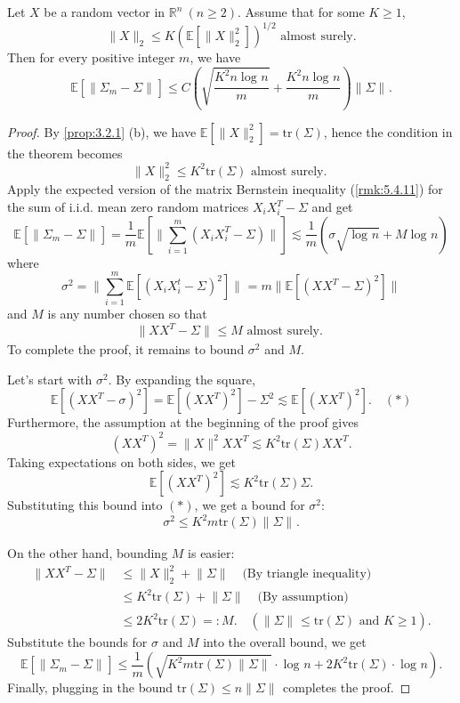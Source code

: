 \begin{theorem}
\label{thm:5.6.1} 
Let $X$ be a random vector in $\mathbb{R}^n \ (n \geq 2)$. Assume that for some $K \geq 1$, 
\[ \lVert X \rVert_{2} \leq K (\mathbb{E}\left[ \lVert X \rVert_{2}^2 \right])^{1/2} \text{ almost surely.} \]
Then for every positive integer $m$, we have 
\[ \mathbb{E}\left[ \lVert \Sigma_m - \Sigma \rVert_{} \right] \leq C \left( 
\sqrt{\frac{K^2 n \log_{}{n}}{m}} + \frac{K^2 n \log_{}{n}}{m} \right) \lVert \Sigma \rVert_{}. \]
\end{theorem}

\begin{proof}
By \cref{prop:3.2.1} (b), we have $\mathbb{E}\left[ \lVert X \rVert_{2}^2 \right] = \mathrm{tr}(\Sigma)$, hence 
the condition in the theorem becomes 
\[ \lVert X \rVert_{2}^2 \leq K^2 \mathrm{tr}(\Sigma) \text{ almost surely. } \]
Apply the expected version of the matrix Bernstein inequality (\cref{rmk:5.4.11}) for the sum of i.i.d. mean 
zero random matrices $X_iX_i^T - \Sigma$ and get 
\[ \mathbb{E}\left[ \lVert \Sigma_m - \Sigma \rVert_{} \right] = 
\frac{1}{m} \mathbb{E}\left[ \lVert \sum_{i = 1}^{m} (X_iX_i^T - \Sigma) \rVert_{} \right] 
\lesssim \frac{1}{m} (\sigma \sqrt{\log_{}{n}} + M \log_{}{n}) \]
where 
\[ \sigma^2 = \lVert \sum_{i = 1}^{m} \mathbb{E}\left[ (X_iX_i^t - \Sigma)^2 \right] \rVert_{} 
= m \lVert \mathbb{E}\left[ (XX^T - \Sigma)^2 \right] \rVert_{} \]
and $M$ is any number chosen so that 
\[ \lVert XX^T - \Sigma \rVert_{} \leq M \text{ almost surely. } \]
To complete the proof, it remains to bound $\sigma^2$ and $M$.

Let's start with $\sigma^2$. By expanding the square, 
\[ \mathbb{E}\left[ (XX^T - \sigma)^2 \right] = \mathbb{E}\left[ (XX^T)^2 \right] - \Sigma^2 
\lesssim \mathbb{E}\left[ (XX^T)^2 \right]. \quad (*) \]
Furthermore, the assumption at the beginning of the proof gives 
\[ (XX^T)^2 = \lVert X \rVert_{}^2 XX^T \lesssim K^2 \mathrm{tr}(\Sigma) XX^T. \]
Taking expectations on both sides, we get 
\[ \mathbb{E}\left[ (XX^T)^2 \right] \lesssim K^2 \mathrm{tr}(\Sigma) \Sigma. \]
Substituting this bound into $(*)$, we get a bound for $\sigma^2$:
\[ \sigma^2 \leq K^2 m \mathrm{tr}(\Sigma) \lVert \Sigma \rVert_{}. \]


On the other hand, bounding $M$ is easier:
\begin{align*}
	\lVert XX^T - \Sigma \rVert_{} 
	&\leq \lVert X \rVert_{2}^2 + \lVert \Sigma \rVert_{} \quad \text{(By triangle inequality)} \\
	&\leq K^2 \mathrm{tr}(\Sigma) + \lVert \Sigma \rVert_{} \quad \text{(By assumption)} \\
	&\leq 2K^2 \mathrm{tr}(\Sigma) =: M. \quad (\lVert \Sigma \rVert_{} \leq \mathrm{tr}(\Sigma) \text{ and } 
	K \geq 1).
\end{align*}
Substitute the bounds for $\sigma$ and $M$ into the overall bound, we get 
\[ \mathbb{E}\left[ \lVert \Sigma_m - \Sigma \rVert_{} \right] \leq 
\frac{1}{m} \left( \sqrt{K^2m \mathrm{tr}(\Sigma) \lVert \Sigma \rVert_{}} \cdot \log_{}{n} 
+ 2K^2 \mathrm{tr}(\Sigma) \cdot \log_{}{n} \right). \]
Finally, plugging in the bound $\mathrm{tr}(\Sigma) \leq n \lVert \Sigma \rVert_{}$ completes the proof.
\end{proof}

